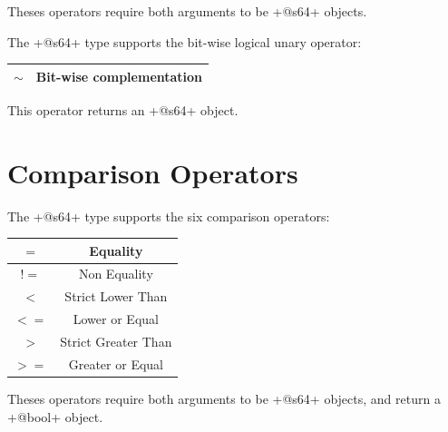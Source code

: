Theses operators require both arguments to be \ggsq+@s64+ objects.\newline


The \ggsq+@s64+ type supports the bit-wise logical unary operator:\newline

\begin{tabular}{|c|c|}
\hline
$\sim$ & Bit-wise complementation \\
\hline
\end{tabular}

This operator returns an \ggsq+@s64+ object.







\section{Comparison Operators}

The \ggsq+@s64+ type supports the six comparison operators:\newline

\begin{tabular}{|c|c|}
\hline
$=$ & Equality \\
\hline
$!=$ & Non Equality \\
\hline
$<$  & Strict Lower Than \\
\hline
$<=$  & Lower or Equal \\
\hline
$>$  & Strict Greater Than \\
\hline
$>=$  & Greater or Equal \\
\hline
\end{tabular}

Theses operators require both arguments to be \ggsq+@s64+ objects, and return a \ggsq+@bool+ object.


